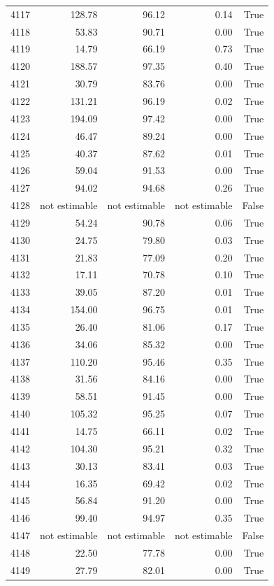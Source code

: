 \begin{longtable}{rrrrr}
4117 & 128.78 & 96.12 & 0.14 & True \\
4118 & 53.83 & 90.71 & 0.00 & True \\
4119 & 14.79 & 66.19 & 0.73 & True \\
4120 & 188.57 & 97.35 & 0.40 & True \\
4121 & 30.79 & 83.76 & 0.00 & True \\
4122 & 131.21 & 96.19 & 0.02 & True \\
4123 & 194.09 & 97.42 & 0.00 & True \\
4124 & 46.47 & 89.24 & 0.00 & True \\
4125 & 40.37 & 87.62 & 0.01 & True \\
4126 & 59.04 & 91.53 & 0.00 & True \\
4127 & 94.02 & 94.68 & 0.26 & True \\
4128 & not estimable & not estimable & not estimable & False \\
4129 & 54.24 & 90.78 & 0.06 & True \\
4130 & 24.75 & 79.80 & 0.03 & True \\
4131 & 21.83 & 77.09 & 0.20 & True \\
4132 & 17.11 & 70.78 & 0.10 & True \\
4133 & 39.05 & 87.20 & 0.01 & True \\
4134 & 154.00 & 96.75 & 0.01 & True \\
4135 & 26.40 & 81.06 & 0.17 & True \\
4136 & 34.06 & 85.32 & 0.00 & True \\
4137 & 110.20 & 95.46 & 0.35 & True \\
4138 & 31.56 & 84.16 & 0.00 & True \\
4139 & 58.51 & 91.45 & 0.00 & True \\
4140 & 105.32 & 95.25 & 0.07 & True \\
4141 & 14.75 & 66.11 & 0.02 & True \\
4142 & 104.30 & 95.21 & 0.32 & True \\
4143 & 30.13 & 83.41 & 0.03 & True \\
4144 & 16.35 & 69.42 & 0.02 & True \\
4145 & 56.84 & 91.20 & 0.00 & True \\
4146 & 99.40 & 94.97 & 0.35 & True \\
4147 & not estimable & not estimable & not estimable & False \\
4148 & 22.50 & 77.78 & 0.00 & True \\
4149 & 27.79 & 82.01 & 0.00 & True \\

\end{longtable}
